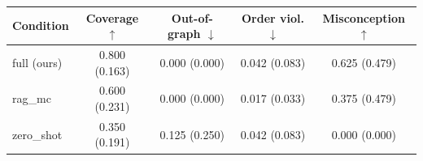 \begin{tabular}{@{}l cccc@{}}
\toprule
Condition & Coverage $\uparrow$ & Out-of-graph $\downarrow$ & Order viol. $\downarrow$ & Misconception $\uparrow$ \\
\midrule
full (ours) & 0.800 (0.163) & 0.000 (0.000) & 0.042 (0.083) & 0.625 (0.479) \\
rag\_mc & 0.600 (0.231) & 0.000 (0.000) & 0.017 (0.033) & 0.375 (0.479) \\
zero\_shot & 0.350 (0.191) & 0.125 (0.250) & 0.042 (0.083) & 0.000 (0.000) \\
\bottomrule
\end{tabular}
